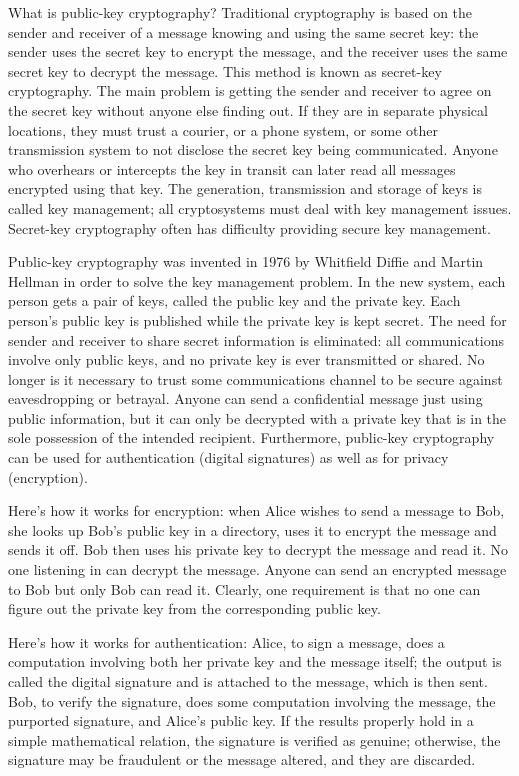 {What is public-key cryptography? }
Traditional cryptography is based on the sender and receiver of a message 
knowing and using the same secret key: the sender uses the secret key to 
encrypt the message, and the receiver uses the same secret key to decrypt 
the message. This method is known as secret-key cryptography. The main 
problem is getting the sender and receiver to agree on the secret key 
without anyone else finding out. If they are in separate physical locations, 
they must trust a courier, or a phone system, or some other transmission 
system to not disclose the secret key being communicated. Anyone who 
overhears or intercepts the key in transit can later read all messages 
encrypted using that key. The generation, transmission and storage of keys 
is called key management; all cryptosystems must deal with key management 
issues. Secret-key cryptography often has difficulty providing secure key 
management.

Public-key cryptography was invented in 1976 by Whitfield Diffie and
Martin Hellman \cite {diffie-hellman} in order to solve the key management
problem. In the new system, each person gets a pair of keys, called the 
public key and the private key. Each person's public key is published while 
the private key is kept secret. The need for sender and receiver to share 
secret information is eliminated: all communications involve only public 
keys, and no private key is ever transmitted or shared. No longer is it 
necessary to trust some communications channel to be secure against 
eavesdropping or betrayal. Anyone can send a confidential message just using 
public information, but it can only be decrypted with a private key that 
is in the sole possession of the intended recipient. Furthermore, public-key 
cryptography can be used for authentication (digital signatures) as well as 
for privacy (encryption). 

Here's how it works for encryption: when Alice wishes to send a message to 
Bob, she looks up Bob's public key in a directory, uses it to encrypt the 
message and sends it off. Bob then uses his private key to decrypt the 
message and read it. No one listening in can decrypt the message. Anyone 
can send an encrypted message to Bob but only Bob can read it. Clearly, one 
requirement is that no one can figure out the private key from the 
corresponding public key.

Here's how it works for authentication: Alice, to sign a message, does
a computation involving both her private key and the message itself; the
output is called the digital signature and is attached to the message,
which is then sent. Bob, to verify the signature, does some computation 
involving the message, the purported signature, and Alice's public key. If 
the results properly hold in a simple mathematical relation, the signature 
is verified as genuine; otherwise, the signature may be fraudulent or the 
message altered, and they are discarded.


